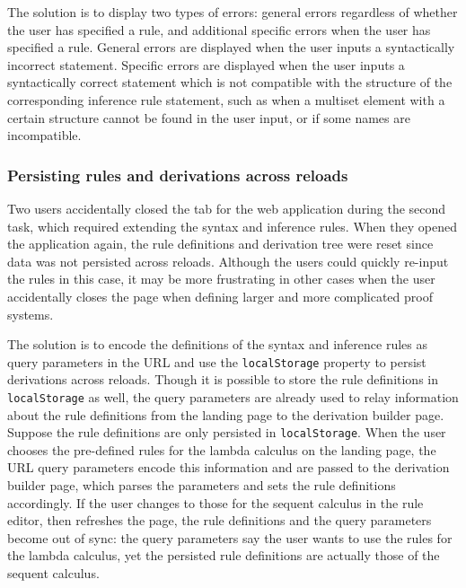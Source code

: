 The solution is to display two types of errors: general errors regardless of whether the user has specified a rule, and additional specific errors when the user has specified a rule. General errors are displayed when the user inputs a syntactically incorrect statement. Specific errors are displayed when the user inputs a syntactically correct statement which is not compatible with the structure of the corresponding inference rule statement, such as when a multiset element with a certain structure cannot be found in the user input, or if some names are incompatible.

\subsubsection{Persisting rules and derivations across reloads}
Two users accidentally closed the tab for the web application during the second task, which required extending the syntax and inference rules. When they opened the application again, the rule definitions and derivation tree were reset since data was not persisted across reloads. Although the users could quickly re-input the rules in this case, it may be more frustrating in other cases when the user accidentally closes the page when defining larger and more complicated proof systems.

The solution is to encode the definitions of the syntax and inference rules as query parameters in the URL and use the \lstinline{localStorage} property \cite{localstorage} to persist derivations across reloads. Though it is possible to store the rule definitions in \lstinline{localStorage} as well, the query parameters are already used to relay information about the rule definitions from the landing page to the derivation builder page. Suppose the rule definitions are only persisted in \lstinline{localStorage}. When the user chooses the pre-defined rules for the lambda calculus on the landing page, the URL query parameters encode this information and are passed to the derivation builder page, which parses the parameters and sets the rule definitions accordingly. If the user changes to those for the sequent calculus in the rule editor, then refreshes the page, the rule definitions and the query parameters become out of sync: the query parameters say the user wants to use the rules for the lambda calculus, yet the persisted rule definitions are actually those of the sequent calculus.